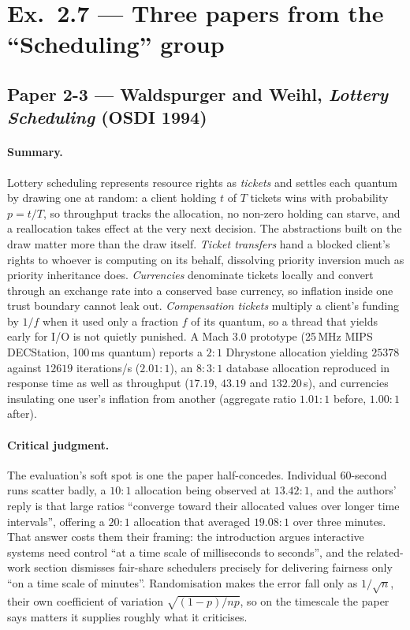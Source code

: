\section*{Ex.~2.7 --- Three papers from the ``Scheduling'' group}

\subsection*{Paper 2-3 --- Waldspurger and Weihl, \emph{Lottery Scheduling} (OSDI 1994)}

\paragraph{Summary.}
Lottery scheduling represents resource rights as \emph{tickets} and settles each quantum by
drawing one at random: a client holding $t$ of $T$ tickets wins with probability $p = t/T$, so
throughput tracks the allocation, no non-zero holding can starve, and a reallocation takes effect
at the very next decision. The abstractions built on the draw matter more than the draw itself.
\emph{Ticket transfers} hand a blocked client's rights to whoever is computing on its
behalf, dissolving priority inversion much as priority inheritance does. \emph{Currencies}
denominate tickets locally and convert through an exchange rate into a conserved base currency,
so inflation inside one trust boundary cannot leak out. \emph{Compensation tickets} multiply a
client's funding by $1/f$ when it used only a fraction $f$ of its quantum, so a thread that
yields early for I/O is not quietly punished. A Mach 3.0 prototype (25\,MHz MIPS DECStation,
100\,ms quantum) reports a $2\!:\!1$ Dhrystone allocation yielding $25378$ against $12619$
iterations/s ($2.01\!:\!1$), an $8\!:\!3\!:\!1$ database allocation reproduced in response time as
well as throughput ($17.19$, $43.19$ and $132.20$\,s), and currencies insulating one user's
inflation from another (aggregate ratio $1.01\!:\!1$ before, $1.00\!:\!1$ after).

\paragraph{Critical judgment.}
The evaluation's soft spot is one the paper half-concedes. Individual 60-second runs scatter
badly, a $10\!:\!1$ allocation being observed at $13.42\!:\!1$, and the authors' reply is that
large ratios ``converge toward their allocated values over longer time intervals'', offering a
$20\!:\!1$ allocation that averaged $19.08\!:\!1$ over three minutes. That answer costs them
their framing: the introduction argues interactive systems need control ``at a time scale of
milliseconds to seconds'', and the related-work section dismisses fair-share schedulers precisely
for delivering fairness only ``on a time scale of minutes''. Randomisation makes the error fall
only as $1/\sqrt{n}$, their own coefficient of variation $\sqrt{(1-p)/np}$, so on the timescale
the paper says matters it supplies roughly what it criticises.

